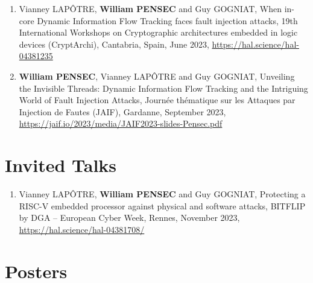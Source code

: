 \begin{enumerate}
    \item Vianney LAPÔTRE, \textbf{William PENSEC} and Guy GOGNIAT, When in-core Dynamic Information Flow Tracking faces fault injection attacks, 19th International Workshops on Cryptographic architectures embedded in logic devices (CryptArchi), Cantabria, Spain, June 2023, \url{https://hal.science/hal-04381235}
    \item \textbf{William PENSEC}, Vianney LAPÔTRE and Guy GOGNIAT, Unveiling the Invisible Threads: Dynamic Information Flow Tracking and the Intriguing World of Fault Injection Attacks, Journée thématique sur les Attaques par Injection de Fautes (JAIF), Gardanne, September 2023, \url{https://jaif.io/2023/media/JAIF2023-slides-Pensec.pdf}
\end{enumerate}
\section{Invited Talks}

\begin{enumerate}
    \item Vianney LAPÔTRE, \textbf{William PENSEC} and Guy GOGNIAT, Protecting a RISC-V embedded processor against physical and software attacks, BITFLIP by DGA -- European Cyber Week, Rennes, November 2023, \url{https://hal.science/hal-04381708/}
\end{enumerate}
\section{Posters}

